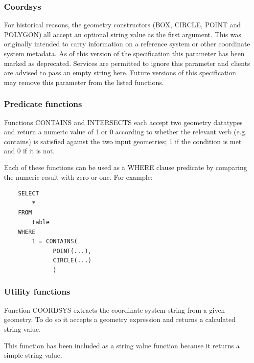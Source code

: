 \documentclass[11pt,a4paper]{ivoa}
\begin{document}
\subsubsection{Coordsys}
\label{sec:geom.coordsys.param}

For historical reasons, the geometry constructors (BOX, CIRCLE, POINT
and POLYGON) all accept an optional string value as the first argument.
This was originally intended to carry
information on a reference system or other coordinate system metadata.
As of this version of the specification this parameter has been
marked as deprecated. Services are permitted to ignore this parameter and
clients are advised to pass an empty string here. Future versions of this
specification may remove this parameter from the listed functions.

\subsubsection{Predicate functions}
\label{sec:functions.geom.predicate}

Functions CONTAINS and INTERSECTS each accept two geometry datatypes
and return a numeric value of 1 or 0 according to whether the relevant
verb (e.g. contains) is satisfied against the two input geometries;
1 if the condition is met and 0 if it is not.

Each of these functions can be used as a WHERE clause predicate by
comparing the numeric result with zero or one.
For example:
\begin{verbatim}
    SELECT
        *
    FROM
        table
    WHERE
        1 = CONTAINS(
              POINT(...),
              CIRCLE(...)
              )
\end{verbatim}


\subsubsection{Utility functions}
\label{sec:functions.geom.utility}

Function COORDSYS extracts the coordinate system string from a given
geometry. To do so it accepts a geometry expression and returns a calculated
string value.

This function has been included as a string value function because it
returns a simple string value.
\end{document}
